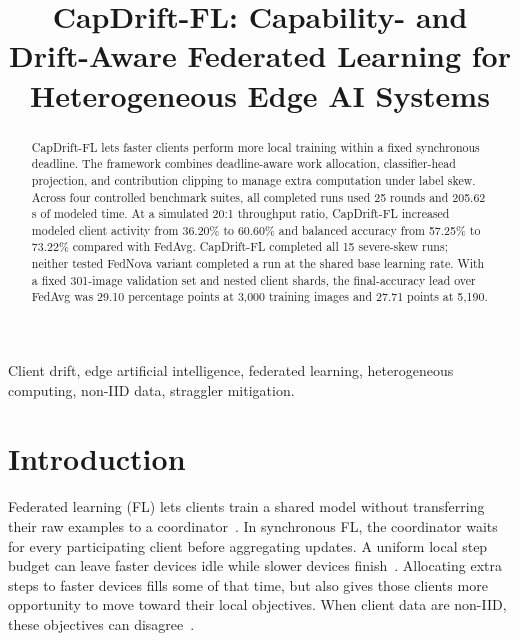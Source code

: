 \documentclass[conference]{IEEEtran}
\begin{document}
\title{CapDrift-FL: Capability- and Drift-Aware Federated Learning for Heterogeneous Edge AI Systems}

\author{
}

\maketitle

\begin{abstract}
CapDrift-FL lets faster clients perform more local training within a fixed synchronous deadline. The framework combines deadline-aware work allocation, classifier-head projection, and contribution clipping to manage extra computation under label skew. Across four controlled benchmark suites, all completed runs used 25 rounds and 205.62\,s of modeled time. At a simulated 20:1 throughput ratio, CapDrift-FL increased modeled client activity from 36.20\% to 60.60\% and balanced accuracy from 57.25\% to 73.22\% compared with FedAvg. CapDrift-FL completed all 15 severe-skew runs; neither tested FedNova variant completed a run at the shared base learning rate. With a fixed 301-image validation set and nested client shards, the final-accuracy lead over FedAvg was 29.10 percentage points at 3,000 training images and 27.71 points at 5,190.
\end{abstract}

\begin{IEEEkeywords}
Client drift, edge artificial intelligence, federated learning, heterogeneous computing, non-IID data, straggler mitigation.
\end{IEEEkeywords}


\section{Introduction}
\label{sec:intro}

Federated learning (FL) lets clients train a shared model without transferring their raw examples to a coordinator~\cite{mcmahan2017}. In synchronous FL, the coordinator waits for every participating client before aggregating updates. A uniform local step budget can leave faster devices idle while slower devices finish~\cite{chai2020tifl,lai2021oort}. Allocating extra steps to faster devices fills some of that time, but also gives those clients more opportunity to move toward their local objectives. When client data are non-IID, these objectives can disagree~\cite{li2020fedprox,karimireddy2020scaffold}.
\end{document}

